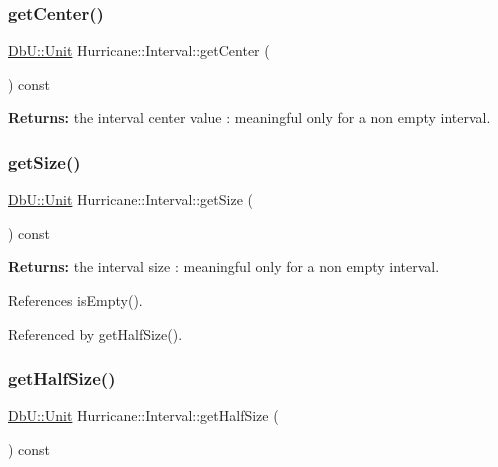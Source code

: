 \subsubsection{\texorpdfstring{get\+Center()}{getCenter()}}
{\footnotesize\ttfamily \mbox{\hyperlink{group__DbUGroup_ga4fbfa3e8c89347af76c9628ea06c4146}{Db\+U\+::\+Unit}} Hurricane\+::\+Interval\+::get\+Center (\begin{DoxyParamCaption}{ }\end{DoxyParamCaption}) const\hspace{0.3cm}{\ttfamily [inline]}}

{\bfseries Returns\+:} the interval center value \+: meaningful only for a non empty interval. \mbox{\label{classHurricane_1_1Interval_a61d877fee3986f93c357910cd63f1caa}} 
\subsubsection{\texorpdfstring{get\+Size()}{getSize()}}
{\footnotesize\ttfamily \mbox{\hyperlink{group__DbUGroup_ga4fbfa3e8c89347af76c9628ea06c4146}{Db\+U\+::\+Unit}} Hurricane\+::\+Interval\+::get\+Size (\begin{DoxyParamCaption}{ }\end{DoxyParamCaption}) const\hspace{0.3cm}{\ttfamily [inline]}}

{\bfseries Returns\+:} the interval size \+: meaningful only for a non empty interval. 

References is\+Empty().



Referenced by get\+Half\+Size().

\mbox{\label{classHurricane_1_1Interval_abe66d75c0854ca0a76189801f0f7d0e3}} 
\subsubsection{\texorpdfstring{get\+Half\+Size()}{getHalfSize()}}
{\footnotesize\ttfamily \mbox{\hyperlink{group__DbUGroup_ga4fbfa3e8c89347af76c9628ea06c4146}{Db\+U\+::\+Unit}} Hurricane\+::\+Interval\+::get\+Half\+Size (\begin{DoxyParamCaption}{ }\end{DoxyParamCaption}) const\hspace{0.3cm}{\ttfamily [inline]}}

